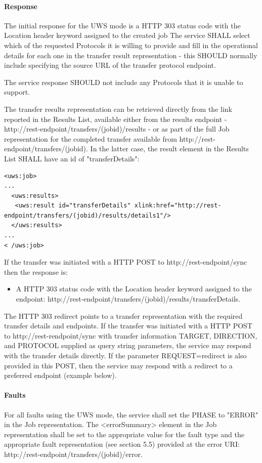 \documentclass[11pt,a4paper]{ivoa}
\begin{document}
\paragraph{Response}
The initial response for the UWS mode is a HTTP 303 status code with the Location header keyword assigned to the created job
The service SHALL select which of the requested Protocols it is willing to provide and fill in the operational details for each one in the transfer result representation - this SHOULD normally include specifying the source URL of the transfer protocol endpoint.

The service response SHOULD not include any Protocols that it is unable to support.

The transfer results representation can be retrieved directly from the link reported in the Results List, available either from the results endpoint - http://rest-endpoint/transfers/(jobid)/results - or as part of the full Job representation for the completed transfer available from http://rest-endpoint/transfers/(jobid). In the latter case, the result element in the Results List SHALL have an id of "transferDetails":
\begin{lstlisting}
<uws:job>
...
  <uws:results>
   <uws:result id="transferDetails" xlink:href="http://rest-endpoint/transfers/(jobid)/results/details1"/>
  </uws:results>
...
< /uws:job>
\end{lstlisting}
If the transfer was initiated with a HTTP POST to http://rest-endpoint/sync then the response is:
\begin{itemize}
    \item A HTTP 303 status code with the Location header keyword assigned to the endpoint: http://rest-endpoint/transfers/(jobid)/results/transferDetails.
\end{itemize}
The HTTP 303 redirect points to a transfer representation with the required transfer details and endpoints.
If the transfer was initiated with a HTTP POST to http://rest-rendpoint/sync with transfer information TARGET, DIRECTION, and PROTOCOL supplied as query string parameters, the service may respond with the transfer details directly. If the parameter REQUEST=redirect is also provided in this POST, then the service may respond with a redirect to a preferred endpoint (example below).

\paragraph{Faults}
For all faults using the UWS mode, the service shall set the PHASE to "ERROR" in the Job representation. The <errorSummary> element in the Job representation shall be set to the appropriate value for the fault type and the appropriate fault representation (see section 5.5) provided at the error URI: http://rest-endpoint/transfers/(jobid)/error.
\end{document}

